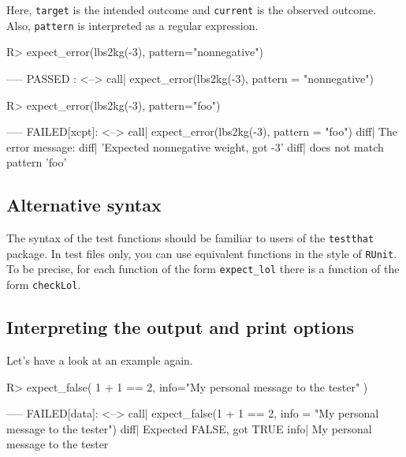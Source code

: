 \documentclass[11pt]{article}
\newcommand{\code}[1]{\texttt{#1}}
\begin{document}
Here, \code{target} is the intended outcome and \code{current} is the observed
outcome. Also, \code{pattern} is interpreted as a regular expression. 
\begin{Schunk}
\begin{Sinput}
R>  expect_error(lbs2kg(-3), pattern="nonnegative")
\end{Sinput}
\begin{Soutput}
----- PASSED      : <-->
 call| expect_error(lbs2kg(-3), pattern = "nonnegative") 
\end{Soutput}
\begin{Sinput}
R>  expect_error(lbs2kg(-3), pattern="foo")
\end{Sinput}
\begin{Soutput}
----- FAILED[xcpt]: <-->
 call| expect_error(lbs2kg(-3), pattern = "foo")
 diff| The error message:
 diff| 'Expected nonnegative weight, got -3'
 diff| does not match pattern 'foo' 
\end{Soutput}
\end{Schunk}


\subsection{Alternative syntax}
The syntax of the test functions should be familiar to users of the
\code{testthat} package\cite{wickham2016testthat}. In test files only, you can
use equivalent functions in the style of \code{RUnit}\cite{burger2016RUnit}. To
be precise, for each function of the form \code{expect\_lol} there is a
function of the form \code{checkLol}.


\subsection{Interpreting the output and print options}
Let's have a look at an example again.
\begin{Schunk}
\begin{Sinput}
R>  expect_false( 1 + 1 == 2, info="My personal message to the tester" )
\end{Sinput}
\begin{Soutput}
----- FAILED[data]: <-->
 call| expect_false(1 + 1 == 2, info = "My personal message to the tester")
 diff| Expected FALSE, got TRUE
 info| My personal message to the tester 
\end{Soutput}
\end{Schunk}
\end{document}
